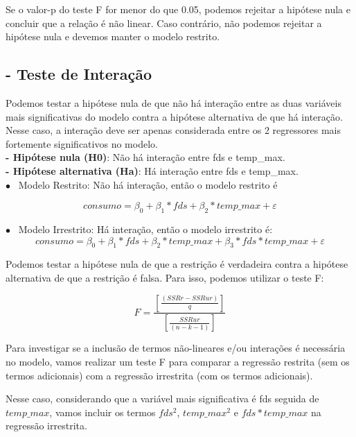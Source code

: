\documentclass[a4paper, 12pt]{article}
\begin{document}
Se o valor-p do teste F for menor do que 0.05, podemos rejeitar a hipótese nula e concluir que a relação é não linear. Caso contrário, não podemos rejeitar a hipótese nula e devemos manter o modelo restrito.\\

\subsection{- Teste de Interação}

Podemos testar a hipótese nula de que não há interação entre as duas variáveis mais significativas do modelo contra a hipótese alternativa de que há interação. Nesse caso, a interação deve ser apenas considerada entre os 2 regressores mais fortemente significativos no modelo.\\


\textbf{- Hipótese nula (H0)}: Não há interação entre fds e temp\_max.\\
\textbf{- Hipótese alternativa (Ha)}: Há interação entre fds e temp\_max.\\

$\bullet$ \>\ Modelo Restrito: Não há interação, então o modelo restrito é

\begin{equation}
    consumo = \beta_0 + \beta_1*fds + \beta_2*temp\_max + \varepsilon  
\end{equation}

$\bullet$ \>\ Modelo Irrestrito: Há interação, então o modelo irrestrito é:
\begin{equation}
    consumo = \beta_0 + \beta_1*fds + \beta_2*temp\_max + \beta_3*fds*temp\_max + \varepsilon    
\end{equation}

Podemos testar a hipótese nula de que a restrição é verdadeira contra a hipótese alternativa de que a restrição é falsa. Para isso, podemos utilizar o teste F:

\begin{equation}
    F = \frac{[\frac{(SSRr - SSRur) }{q}]}{ [\frac{SSRur}{(n - k - 1)}]}
\end{equation}


Para investigar se a inclusão de termos não-lineares e/ou interações é necessária no modelo, vamos realizar um teste F para comparar a regressão restrita (sem os termos adicionais) com a regressão irrestrita (com os termos adicionais).

Nesse caso, considerando que a variável mais significativa é fds seguida de $temp\_max$, vamos incluir os termos $fds^2$, $temp\_max^2$ e $fds*temp\_max$ na regressão irrestrita.\\
\end{document}
